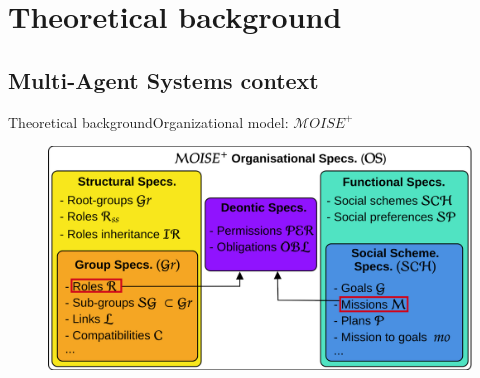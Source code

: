 \AtBeginSection[]{
    \begin{frame}
        \frametitle{}
        \tableofcontents[currentsection]
    \end{frame}
}


\section{Theoretical background}

\subsection{Multi-Agent Systems context}

\begin{frame}{Theoretical background}{Organizational model: $\mathcal{M}OISE^+$}

    \begin{figure}
        \centering
        \includegraphics[width=0.9\linewidth]{figures/moise_model.png}
    \end{figure}

\end{frame}

